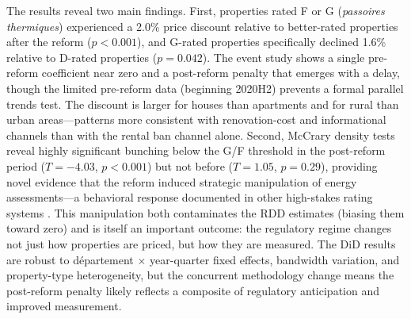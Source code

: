\documentclass[12pt]{article}
\begin{document}
The results reveal two main findings. First, properties rated F or G (\textit{passoires thermiques}) experienced a 2.0\% price discount relative to better-rated properties after the reform ($p < 0.001$), and G-rated properties specifically declined 1.6\% relative to D-rated properties ($p = 0.042$). The event study shows a single pre-reform coefficient near zero and a post-reform penalty that emerges with a delay, though the limited pre-reform data (beginning 2020H2) prevents a formal parallel trends test. The discount is larger for houses than apartments and for rural than urban areas---patterns more consistent with renovation-cost and informational channels than with the rental ban channel alone. Second, McCrary density tests reveal highly significant bunching below the G/F threshold in the post-reform period ($T = -4.03$, $p < 0.001$) but not before ($T = 1.05$, $p = 0.29$), providing novel evidence that the reform induced strategic manipulation of energy assessments---a behavioral response documented in other high-stakes rating systems \citep{lee2010regression}. This manipulation both contaminates the RDD estimates (biasing them toward zero) and is itself an important outcome: the regulatory regime changes not just how properties are priced, but how they are measured. The DiD results are robust to d\'epartement $\times$ year-quarter fixed effects, bandwidth variation, and property-type heterogeneity, but the concurrent methodology change means the post-reform penalty likely reflects a composite of regulatory anticipation and improved measurement.
\end{document}
